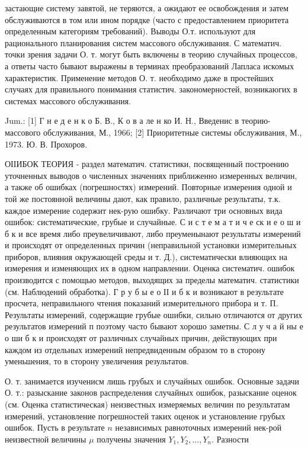 \documentclass[10pt]{article}
\begin{document}
застающие систему завятой, не теряются, а ожидают ее освобождения и затем обслуживаются в том или ином порядке (часто с предоставлением приоритета определенным категориям требований). Выводы О.т. используют для рационального планирования систем массового обслуживания. С математич. точки зрения задачи О. т. могут быть включены в теорию случайных процессов, а ответы часто бывают выражены в терминах преобразований Лапласа искомых характеристик. Применение методов О. т. необходимо даже в простейших случаях для правильного понимания статистич. закономерностей, возникаюгих в системах массового обслуживания.

Jum.: [1] Г н е д е н к о Б. В., К о в а ле н ко И. Н., Введенис в теорию-массового обслуживания, М., 1966; [2] Приоритетные системы обслуживания, М., 1973. Ю. В. Прохоров.

ОІІИБОК ТЕОРИЯ - раздел математич. статистики, посвященный построению уточненных выводов о численных значениях приближенно измеренных величин, а также об ошибках (погрешностях) измерений. Повторные измерения одной и той же постоянной величины дают, как правило, различные результаты, т.к. каждое измерение содержит нек-рую ошибку. Различают три основных вида ошибок: систематические, грубые и случайные. С и с т е м а т и ч е ск и е о ш и б к и все время либо преувеличивают, либо преуменынают результаты измерений и происходят от определенных причин (неправильной установки измерительных приборов, влияния окружающей среды и т. Д.), систематически влияющих на измерения и изменяющих их в одном направлении. Оценка систематич. ошибок производится с помощью методов, выходящих за пределы математич. статистики (см. Наблюдений обработка). Г р у б ы е о ІІ и б к и возникают в результате просчета, неправильного чтения показаний измерительного прибора и т. П. Результаты измерений, содержащие грубые ошибки, сильно отличаются от других результатов измерений п поэтому часто бывают хорошо заметны. С л у ч а й ны е о ши б к и происходят от различных случайных причин, действующих при каждом из отдельных измерений непредвиденным образом то в сторону уменьшения, то в сторону увеличения результатов.

О. т. занимается изученисм лишь грубых и случайных ошибок. Основные задачи О. т.: разыскание законов распределения случайных ошибок, разыскание оценок (см. Оценка статистическая) неизвестных измеряемых величин по результатам измерений, установление погрешностей таких оценок и установление грубых ошибок. Пусть в результате $n$ независимых равноточных измерений нек-рой неизвестной величины $\mu$ получены значения $Y_{1}, Y_{2}, \ldots, Y_{n}$. Разности
\end{document}
